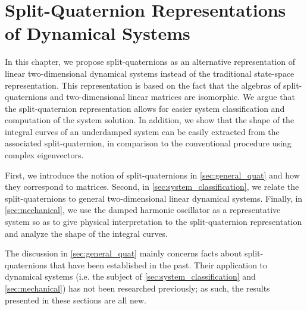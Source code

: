 \chapter{Split-Quaternion Representations of Dynamical Systems}
\label{chap:quaternion}
In this chapter, we propose split-quaternions as an alternative representation of linear two-dimensional dynamical systems instead of the traditional state-space representation. This representation is based on the fact that the algebras of split-quaternions and two-dimensional linear matrices are isomorphic. We argue that the split-quaternion representation allows for easier system classification and computation of the system solution. In addition, we show that the shape of the integral curves of an underdamped system can be easily extracted from the associated split-quaternion, in comparison to the conventional procedure using complex eigenvectors.

First, we introduce the notion of split-quaternions in \cref{sec:general_quat} and how they correspond to matrices. Second, in \cref{sec:system_classification}, we relate the split-quaternions to general two-dimensional linear dynamical systems. Finally, in \cref{sec:mechanical}, we use the damped harmonic oscillator as a representative system so as to give physical interpretation to the split-quaternion representation and analyze the shape of the integral curves. 

The discussion in \cref{sec:general_quat} mainly concerns facts about split-quaternions that have been established in the past. Their application to dynamical systems (i.e. the subject of \cref{sec:system_classification} and \cref{sec:mechanical}) has not been researched previously; as such, the results presented in these sections are all new.






